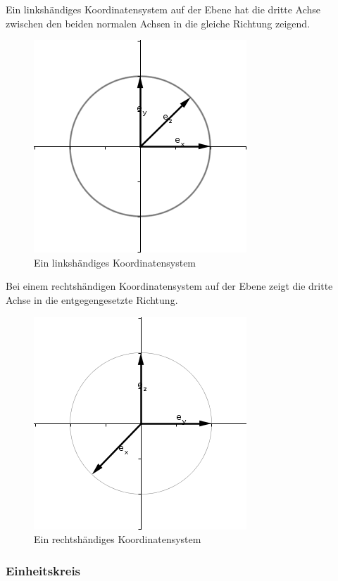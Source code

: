 \documentclass[a4paper]{article}
\begin{document}
Ein linksh\"andiges Koordinatensystem auf der Ebene hat die dritte Achse zwischen den beiden normalen Achsen in die gleiche Richtung zeigend.\\

\begin{figure}
\caption{Ein linksh\"andiges Koordinatensystem}
\includegraphics[scale=0.5]{lefthand45.png}
\end{figure}

Bei einem rechtsh\"andigen Koordinatensystem auf der Ebene zeigt die dritte Achse in die entgegengesetzte Richtung.\\

\begin{figure}
\caption{Ein rechtsh\"andiges Koordinatensystem}
\includegraphics[scale=0.5]{righthand45.png}
\end{figure}

\subsubsection{Einheitskreis}
\end{document}

